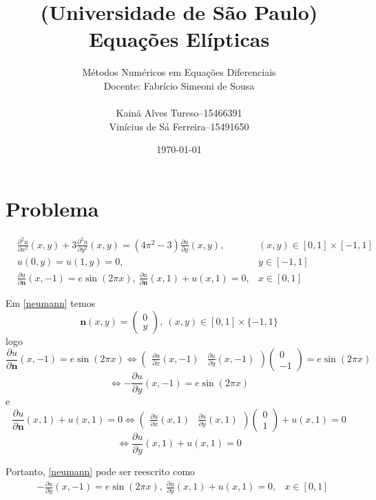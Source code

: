 \documentclass{article}
\title{(Universidade de São Paulo)\\
Equações Elípticas}
\author{Métodos Numéricos em Equações Diferenciais\\
Docente: Fabrício Simeoni de Sousa\\[.2cm]
\begin{tabular}{r@{\ }c@{\ }l}
    Kainã Alves Tureso      &-- &15466391\\
    Vinícius de Sá Ferreira &-- &15491650
\end{tabular}}
\date{\today}
\begin{document}
    \maketitle

    \tableofcontents
    
    \section{Problema}
    \begin{align}
        &\frac{\partial^2 u}{\partial x^2}(x,y) + 3\frac{\partial^2 u}{\partial y^2}(x,y) = (4\pi^2-3)\frac{\partial u}{\partial y}(x,y),& (x,y) \in [0,1] \times [-1,1] \label{eq}\\
        &u(0,y)=u(1,y)=0,& y \in [-1,1] \label{dirichlet}\\
        &\frac{\partial u}{\partial \mathbf{n}}(x,-1) = e \sin(2\pi x),\ \frac{\partial u }{\partial \mathbf{n}}(x,1) + u(x,1) = 0,& x \in [0,1] \label{neumann}
    \end{align}

    Em \ref{neumann} temos
    \[\mathbf{n}(x,y) = \begin{pmatrix}0 \\ y\end{pmatrix},\ (x,y) \in [0,1] \times \{-1,1\}\]
    logo
    \[\frac{\partial u}{\partial \mathbf{n}}(x,-1) = e \sin(2\pi x) \iff
    \begin{pmatrix}\frac{\partial u}{\partial x}(x,-1) & \frac{\partial u}{\partial y}(x,-1)\end{pmatrix} \begin{pmatrix}0 \\ -1\end{pmatrix} = e \sin(2\pi x)\]
    \[\iff -\frac{\partial u}{\partial y}(x,-1) = e \sin(2\pi x)\]
    e
    \[\frac{\partial u }{\partial \mathbf{n}}(x,1) + u(x,1) = 0 \iff
    \begin{pmatrix}\frac{\partial u}{\partial x}(x,1) & \frac{\partial u}{\partial y}(x,1)\end{pmatrix} \begin{pmatrix}0 \\ 1\end{pmatrix} + u(x,1) = 0\]
    \[\iff \frac{\partial u}{\partial y}(x,1) + u(x,1) = 0\]

    Portanto, \ref{neumann} pode ser reescrito como
    \begin{align}
        &-\frac{\partial u}{\partial y}(x,-1) = e \sin(2\pi x),\ \frac{\partial u}{\partial y}(x,1) + u(x,1) = 0,& x \in [0,1] \label{neumann_remake}
    \end{align}
\end{document}
